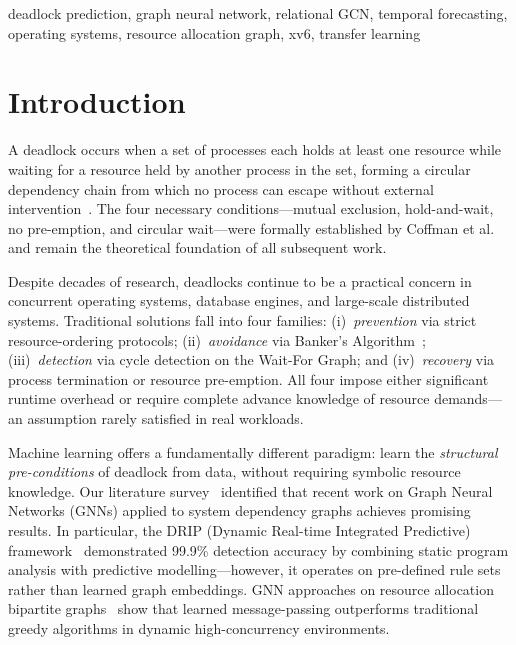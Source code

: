 \documentclass[conference]{IEEEtran}
\begin{document}
\begin{IEEEkeywords}
deadlock prediction, graph neural network, relational GCN, temporal forecasting,
operating systems, resource allocation graph, xv6, transfer learning
\end{IEEEkeywords}

\section{Introduction}

A deadlock occurs when a set of processes each holds at least one resource while
waiting for a resource held by another process in the set, forming a circular
dependency chain from which no process can escape without external
intervention~\cite{silberschatz2018}. The four necessary conditions—mutual
exclusion, hold-and-wait, no pre-emption, and circular wait—were formally
established by Coffman et al.~\cite{coffman1971} and remain the theoretical
foundation of all subsequent work.

Despite decades of research, deadlocks continue to be a practical concern in
concurrent operating systems, database engines, and large-scale distributed
systems. Traditional solutions fall into four families: (i)~\emph{prevention}
via strict resource-ordering protocols; (ii)~\emph{avoidance} via Banker's
Algorithm~\cite{dijkstra1965}; (iii)~\emph{detection} via cycle detection on
the Wait-For Graph; and (iv)~\emph{recovery} via process termination or
resource pre-emption. All four impose either significant runtime overhead or
require complete advance knowledge of resource demands—an assumption rarely
satisfied in real workloads.

Machine learning offers a fundamentally different paradigm: learn the
\emph{structural pre-conditions} of deadlock from data, without requiring
symbolic resource knowledge. Our literature survey~\cite{survey2024} identified
that recent work on Graph Neural Networks (GNNs) applied to system dependency
graphs achieves promising results. In particular, the DRIP (Dynamic Real-time
Integrated Predictive) framework~\cite{drip2024} demonstrated 99.9\% detection
accuracy by combining static program analysis with predictive modelling—however,
it operates on pre-defined rule sets rather than learned graph embeddings. GNN
approaches on resource allocation bipartite graphs~\cite{wang2021} show that
learned message-passing outperforms traditional greedy algorithms in dynamic
high-concurrency environments.
\end{document}
